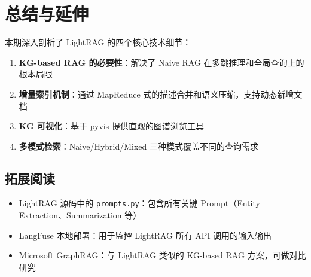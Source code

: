 \section{总结与延伸}

本期深入剖析了 LightRAG 的四个核心技术细节：

\begin{enumerate}
    \item \textbf{KG-based RAG 的必要性}：解决了 Naive RAG 在多跳推理和全局查询上的根本局限
    \item \textbf{增量索引机制}：通过 MapReduce 式的描述合并和语义压缩，支持动态新增文档
    \item \textbf{KG 可视化}：基于 pyvis 提供直观的图谱浏览工具
    \item \textbf{多模式检索}：Naive/Hybrid/Mixed 三种模式覆盖不同的查询需求
\end{enumerate}

\subsection{拓展阅读}

\begin{itemize}
    \item LightRAG 源码中的 \texttt{prompts.py}：包含所有关键 Prompt（Entity Extraction、Summarization 等）
    \item LangFuse 本地部署：用于监控 LightRAG 所有 API 调用的输入输出
    \item Microsoft GraphRAG：与 LightRAG 类似的 KG-based RAG 方案，可做对比研究
\end{itemize}



